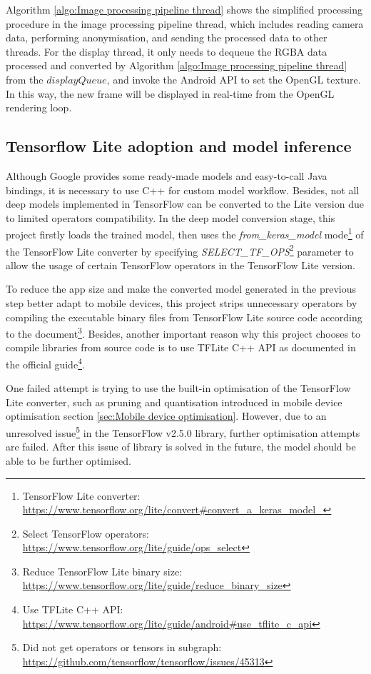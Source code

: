 Algorithm \ref{algo:Image processing pipeline thread} shows the simplified processing procedure in the image processing pipeline thread, which includes reading camera data, performing anonymisation, and sending the processed data to other threads.
For the display thread, it only needs to dequeue the RGBA data processed and converted by Algorithm \ref{algo:Image processing pipeline thread} from the $displayQueue$, and invoke the Android API to set the OpenGL texture.
In this way, the new frame will be displayed in real-time from the OpenGL rendering loop.

\subsection{Tensorflow Lite adoption and model inference}
Although Google provides some ready-made models and easy-to-call Java bindings, it is necessary to use C++ for custom model workflow.
Besides, not all deep models implemented in TensorFlow can be converted to the Lite version due to limited operators compatibility.
In the deep model conversion stage, this project firstly loads the trained model, then uses the \textit{from\_keras\_model} mode\footnote{TensorFlow Lite converter: \url{https://www.tensorflow.org/lite/convert\#convert_a_keras_model_}} of the TensorFlow Lite converter by specifying \textit{SELECT\_TF\_OPS}\footnote{Select TensorFlow operators: \url{https://www.tensorflow.org/lite/guide/ops_select}} parameter to allow the usage of certain TensorFlow operators in the TensorFlow Lite version.

To reduce the app size and make the converted model generated in the previous step better adapt to mobile devices, this project strips unnecessary operators by compiling the executable binary files from TensorFlow Lite source code according to the document\footnote{Reduce TensorFlow Lite binary size: \url{https://www.tensorflow.org/lite/guide/reduce_binary_size}}.
Besides, another important reason why this project chooses to compile libraries from source code is to use TFLite C++ API as documented in the official guide\footnote{Use TFLite C++ API: \url{https://www.tensorflow.org/lite/guide/android\#use_tflite_c_api}}.

One failed attempt is trying to use the built-in optimisation of the TensorFlow Lite converter, such as pruning and quantisation introduced in mobile device optimisation section \ref{sec:Mobile device optimisation}.
However, due to an unresolved issue\footnote{Did not get operators or tensors in subgraph: \url{https://github.com/tensorflow/tensorflow/issues/45313}} in the TensorFlow v2.5.0 library, further optimisation attempts are failed.
After this issue of library is solved in the future, the model should be able to be further optimised.

